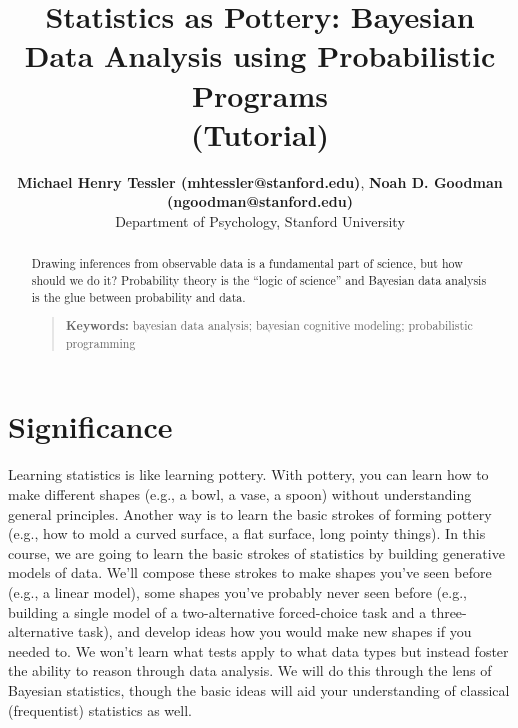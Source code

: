 \documentclass[10pt,letterpaper]{article}
\title{Statistics as Pottery: Bayesian Data Analysis using Probabilistic Programs \\(Tutorial)}
\author{{\large \bf Michael Henry Tessler (mhtessler@stanford.edu)}, {\large \bf Noah D. Goodman (ngoodman@stanford.edu)}  \\
  Department of Psychology, Stanford University
  }
\newcommand{\ndg}[1]{\textcolor{green}{[ndg: #1]}}
\begin{document}
\maketitle

\begin{abstract}

Drawing inferences from observable data is a fundamental part of science, but how should we do it?
Probability theory is the ``logic of science'' \cite{jaynes2003probability} and Bayesian data analysis is the glue between probability and data.
\begin{quote}
\small
\textbf{Keywords:} 
bayesian data analysis; bayesian cognitive modeling; probabilistic programming
\end{quote}

\end{abstract}





\section{Significance}

Learning statistics is like learning pottery. 
With pottery, you can learn how to make different shapes (e.g., a bowl, a vase, a spoon) without understanding general principles. 
Another way is to learn the basic strokes of forming pottery (e.g., how to mold a curved surface, a flat surface, long pointy things). 
In this course, we are going to learn the basic strokes of statistics by building generative models of data. 
We'll compose these strokes to make shapes you've seen before (e.g., a linear model), some shapes you've probably never seen before (e.g., building a single model of a two-alternative forced-choice task and a three-alternative task), and develop ideas how you would make new shapes if you needed to. 
We won't learn what tests apply to what data types but instead foster the ability to reason through data analysis. 
We will do this through the lens of Bayesian statistics, though the basic ideas will aid your understanding of classical (frequentist) statistics as well.


\end{document}
